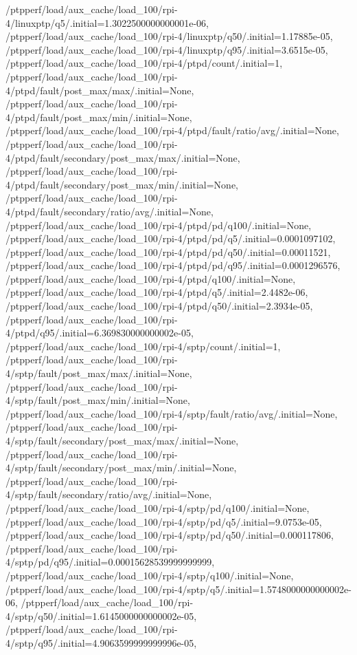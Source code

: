 {    /ptpperf/load/aux_cache/load_100/rpi-4/linuxptp/q5/.initial=1.3022500000000001e-06,
    /ptpperf/load/aux_cache/load_100/rpi-4/linuxptp/q50/.initial=1.17885e-05,
    /ptpperf/load/aux_cache/load_100/rpi-4/linuxptp/q95/.initial=3.6515e-05,
    /ptpperf/load/aux_cache/load_100/rpi-4/ptpd/count/.initial=1,
    /ptpperf/load/aux_cache/load_100/rpi-4/ptpd/fault/post_max/max/.initial=None,
    /ptpperf/load/aux_cache/load_100/rpi-4/ptpd/fault/post_max/min/.initial=None,
    /ptpperf/load/aux_cache/load_100/rpi-4/ptpd/fault/ratio/avg/.initial=None,
    /ptpperf/load/aux_cache/load_100/rpi-4/ptpd/fault/secondary/post_max/max/.initial=None,
    /ptpperf/load/aux_cache/load_100/rpi-4/ptpd/fault/secondary/post_max/min/.initial=None,
    /ptpperf/load/aux_cache/load_100/rpi-4/ptpd/fault/secondary/ratio/avg/.initial=None,
    /ptpperf/load/aux_cache/load_100/rpi-4/ptpd/pd/q100/.initial=None,
    /ptpperf/load/aux_cache/load_100/rpi-4/ptpd/pd/q5/.initial=0.0001097102,
    /ptpperf/load/aux_cache/load_100/rpi-4/ptpd/pd/q50/.initial=0.00011521,
    /ptpperf/load/aux_cache/load_100/rpi-4/ptpd/pd/q95/.initial=0.0001296576,
    /ptpperf/load/aux_cache/load_100/rpi-4/ptpd/q100/.initial=None,
    /ptpperf/load/aux_cache/load_100/rpi-4/ptpd/q5/.initial=2.4482e-06,
    /ptpperf/load/aux_cache/load_100/rpi-4/ptpd/q50/.initial=2.3934e-05,
    /ptpperf/load/aux_cache/load_100/rpi-4/ptpd/q95/.initial=6.369830000000002e-05,
    /ptpperf/load/aux_cache/load_100/rpi-4/sptp/count/.initial=1,
    /ptpperf/load/aux_cache/load_100/rpi-4/sptp/fault/post_max/max/.initial=None,
    /ptpperf/load/aux_cache/load_100/rpi-4/sptp/fault/post_max/min/.initial=None,
    /ptpperf/load/aux_cache/load_100/rpi-4/sptp/fault/ratio/avg/.initial=None,
    /ptpperf/load/aux_cache/load_100/rpi-4/sptp/fault/secondary/post_max/max/.initial=None,
    /ptpperf/load/aux_cache/load_100/rpi-4/sptp/fault/secondary/post_max/min/.initial=None,
    /ptpperf/load/aux_cache/load_100/rpi-4/sptp/fault/secondary/ratio/avg/.initial=None,
    /ptpperf/load/aux_cache/load_100/rpi-4/sptp/pd/q100/.initial=None,
    /ptpperf/load/aux_cache/load_100/rpi-4/sptp/pd/q5/.initial=9.0753e-05,
    /ptpperf/load/aux_cache/load_100/rpi-4/sptp/pd/q50/.initial=0.000117806,
    /ptpperf/load/aux_cache/load_100/rpi-4/sptp/pd/q95/.initial=0.00015628539999999999,
    /ptpperf/load/aux_cache/load_100/rpi-4/sptp/q100/.initial=None,
    /ptpperf/load/aux_cache/load_100/rpi-4/sptp/q5/.initial=1.5748000000000002e-06,
    /ptpperf/load/aux_cache/load_100/rpi-4/sptp/q50/.initial=1.6145000000000002e-05,
    /ptpperf/load/aux_cache/load_100/rpi-4/sptp/q95/.initial=4.9063599999999996e-05,
}
